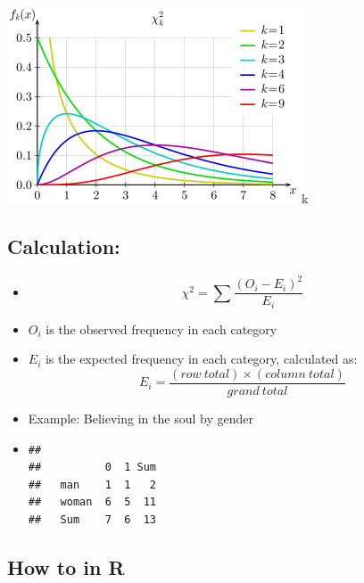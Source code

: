 \documentclass[
]{book}
\begin{document}
\includegraphics{./img/chidist.png}k

\subsection{Calculation:}\label{calculation}

\begin{itemize}
\item
  \[\chi^2 = \sum \frac{(O_i - E_i)^2}{E_i}\]
\item
  \(O_i\) is the observed frequency in each category
\item
  \(E_i\) is the expected frequency in each category, calculated as: \[E_i = \frac{(row \ total) \times (column \ total)}{grand \ total}\]
\item
  Example: Believing in the soul by gender
\item
\begin{verbatim}
##        
##          0  1 Sum
##   man    1  1   2
##   woman  6  5  11
##   Sum    7  6  13
\end{verbatim}
\end{itemize}

\subsection{How to in R}\label{how-to-in-r}
\end{document}
